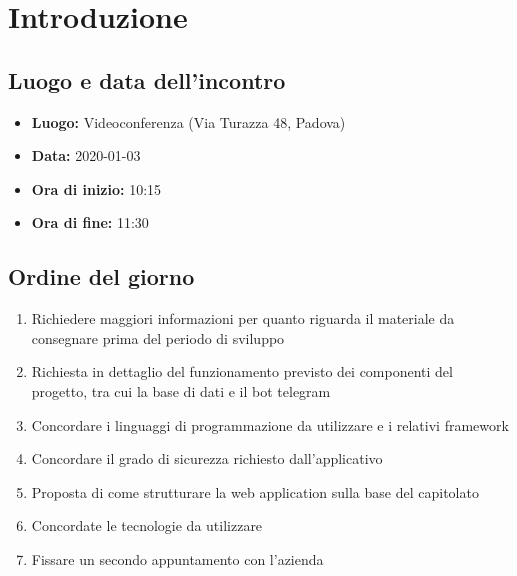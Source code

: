 \section*{Introduzione}

\subsection*{Luogo e data dell'incontro}
	\begin{itemize}
		\item \textbf{Luogo:} Videoconferenza (Via Turazza 48, Padova)
		\item \textbf{Data:} 2020-01-03
		\item \textbf{Ora di inizio:} 10:15
		\item \textbf{Ora di fine:} 11:30
	\end{itemize}

\subsection*{Ordine del giorno}
	\begin{enumerate}
		\item Richiedere maggiori informazioni per quanto riguarda il materiale da consegnare prima del periodo di sviluppo
		\item Richiesta in dettaglio del funzionamento previsto dei componenti del progetto, tra cui la base di dati e il bot telegram
		\item Concordare i linguaggi di programmazione da utilizzare e i relativi framework
		\item Concordare il grado di sicurezza richiesto dall'applicativo
		\item Proposta di come strutturare la web application sulla base del capitolato
		\item Concordate le tecnologie da utilizzare
		\item Fissare un secondo appuntamento con l'azienda
	\end{enumerate}

